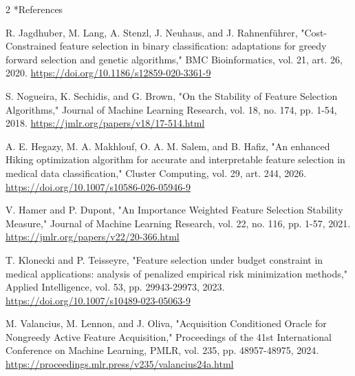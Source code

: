 \documentclass[10pt,a4paper]{article}
\makeatletter
\renewcommand{\section}{\@startsection{section}{1}{0pt}{5pt}{2pt}{\normalfont\normalsize\bfseries}}
\newcommand{\sect}[1]{\section*{#1}}
\makeatother
\begin{document}
\begin{multicols}{2}
\sect{References}
\begin{minipage}{\linewidth}{\fontsize{7}{8.2}\selectfont [1] R. Jagdhuber, M. Lang, A. Stenzl, J. Neuhaus, and J. Rahnenführer, "Cost-Constrained feature selection in binary classification: adaptations for greedy forward selection and genetic algorithms," BMC Bioinformatics, vol. 21, art. 26, 2020. \url{https://doi.org/10.1186/s12859-020-3361-9}\par}\end{minipage}\par
\begin{minipage}{\linewidth}{\fontsize{7}{8.2}\selectfont [2] S. Nogueira, K. Sechidis, and G. Brown, "On the Stability of Feature Selection Algorithms," Journal of Machine Learning Research, vol. 18, no. 174, pp. 1-54, 2018. \url{https://jmlr.org/papers/v18/17-514.html}\par}\end{minipage}\par
\begin{minipage}{\linewidth}{\fontsize{7}{8.2}\selectfont [3] A. E. Hegazy, M. A. Makhlouf, O. A. M. Salem, and B. Hafiz, "An enhanced Hiking optimization algorithm for accurate and interpretable feature selection in medical data classification," Cluster Computing, vol. 29, art. 244, 2026. \url{https://doi.org/10.1007/s10586-026-05946-9}\par}\end{minipage}\par
\begin{minipage}{\linewidth}{\fontsize{7}{8.2}\selectfont [4] V. Hamer and P. Dupont, "An Importance Weighted Feature Selection Stability Measure," Journal of Machine Learning Research, vol. 22, no. 116, pp. 1-57, 2021. \url{https://jmlr.org/papers/v22/20-366.html}\par}\end{minipage}\par
\begin{minipage}{\linewidth}{\fontsize{7}{8.2}\selectfont [5] T. Klonecki and P. Teisseyre, "Feature selection under budget constraint in medical applications: analysis of penalized empirical risk minimization methods," Applied Intelligence, vol. 53, pp. 29943-29973, 2023. \url{https://doi.org/10.1007/s10489-023-05063-9}\par}\end{minipage}\par
\begin{minipage}{\linewidth}{\fontsize{7}{8.2}\selectfont [6] M. Valancius, M. Lennon, and J. Oliva, "Acquisition Conditioned Oracle for Nongreedy Active Feature Acquisition," Proceedings of the 41st International Conference on Machine Learning, PMLR, vol. 235, pp. 48957-48975, 2024. \url{https://proceedings.mlr.press/v235/valancius24a.html}\par}\end{minipage}\par

\end{multicols}
\end{document}
